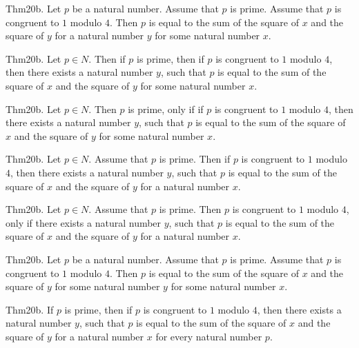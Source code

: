 \documentclass{article}
\begin{document}
Thm20b. Let $p$ be a natural number. Assume that $p$ is prime. Assume that $p$ is congruent to $1$ modulo $4$. Then $p$ is equal to the sum of the square of $x$ and the square of $y$ for a natural number $y$ for some natural number $x$.

Thm20b. Let $p \in N$. Then if $p$ is prime, then if $p$ is congruent to $1$ modulo $4$, then there exists a natural number $y$, such that $p$ is equal to the sum of the square of $x$ and the square of $y$ for some natural number $x$.

Thm20b. Let $p \in N$. Then $p$ is prime, only if if $p$ is congruent to $1$ modulo $4$, then there exists a natural number $y$, such that $p$ is equal to the sum of the square of $x$ and the square of $y$ for some natural number $x$.

Thm20b. Let $p \in N$. Assume that $p$ is prime. Then if $p$ is congruent to $1$ modulo $4$, then there exists a natural number $y$, such that $p$ is equal to the sum of the square of $x$ and the square of $y$ for a natural number $x$.

Thm20b. Let $p \in N$. Assume that $p$ is prime. Then $p$ is congruent to $1$ modulo $4$, only if there exists a natural number $y$, such that $p$ is equal to the sum of the square of $x$ and the square of $y$ for a natural number $x$.

Thm20b. Let $p$ be a natural number. Assume that $p$ is prime. Assume that $p$ is congruent to $1$ modulo $4$. Then $p$ is equal to the sum of the square of $x$ and the square of $y$ for some natural number $y$ for some natural number $x$.

Thm20b. If $p$ is prime, then if $p$ is congruent to $1$ modulo $4$, then there exists a natural number $y$, such that $p$ is equal to the sum of the square of $x$ and the square of $y$ for a natural number $x$ for every natural number $p$.
\end{document}
